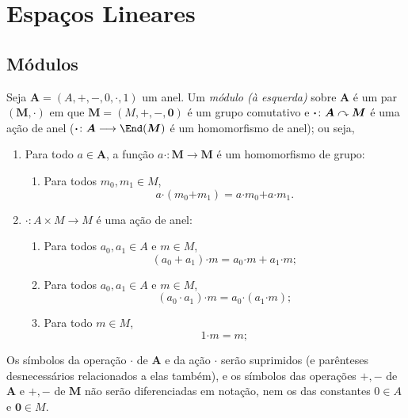 \chapter{Espaços Lineares}

\section{Módulos}

\begin{defi}
Seja $\bm A=(A,+,-,0,\cdot,1)$ um anel. Um \emph{módulo (à esquerda)} sobre $\bm A$ é um par $(\bm M,\bm \cdot)$ em que $\bm M=(M,\bm +,\bm -,\bm 0)$ é um grupo comutativo e $\bm \cdot\colon \bm A \curvearrowright \bm M$ é uma ação de anel ($\bm \cdot\colon \bm A \to \End(\bm M)$ é um homomorfismo de anel); ou seja,
	\begin{enumerate}
	\item  Para todo $a \in \bm A$, a função $a \bm \cdot\colon \bm M \to \bm M$ é um homomorfismo de grupo:
		\begin{enumerate}
		\item Para todos $m_0,m_1 \in M$,
			\begin{equation*}
			a \bm \cdot (m_0 \bm + m_1) = a \bm \cdot m_0 \bm + a \bm \cdot m_1.
			\end{equation*}
		\end{enumerate}
	\item $\bm \cdot \colon A \times M \to M$ é uma ação de anel:
		\begin{enumerate}
		\item Para todos $a_0,a_1 \in A$ e $m \in M$,
			\begin{equation*}
			(a_0 + a_1) \bm \cdot m = a_0 \bm \cdot m + a_1 \bm \cdot m;
			\end{equation*}
		\item Para todos $a_0,a_1 \in A$ e $m \in M$,
			\begin{equation*}
			(a_0 \cdot a_1) \bm \cdot m = a_0 \bm \cdot (a_1 \bm \cdot m);
			\end{equation*}
		\item Para todo $m \in M$,
			\begin{equation*}
			1 \bm \cdot m = m;
			\end{equation*}
		\end{enumerate}
	\end{enumerate}
Os símbolos da operação $\cdot$ de $\bm A$ e da ação $\bm \cdot$ serão suprimidos (e parênteses desnecessários relacionados a elas também), e os símbolos das operações $+,-$ de $\bm A$ e $\bm +,\bm -$ de $\bm M$ não serão diferenciadas em notação, nem os das constantes $0 \in A$ e $\bm 0 \in M$.
\end{defi}

